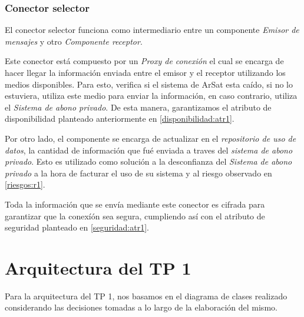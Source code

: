 \documentclass[a4paper, 10pt, twoside]{article}
\begin{document}
\subsubsection{Conector selector}

El conector selector funciona como intermediario entre un componente \textit{Emisor de mensajes} y otro \textit{Componente receptor}.

Este conector está compuesto por un \textit{Proxy de conexión} el cual se encarga de hacer llegar la información enviada entre el emisor y el receptor utilizando los medios disponibles. Para esto, verifica si el sistema de ArSat esta caído, si no lo estuviera, utiliza este medio para enviar la información, en caso contrario, utiliza el \textit{Sistema de abono privado}. De esta manera, garantizamos el atributo de disponibilidad planteado anteriormente en \ref{disponibilidad:atr1}.

Por otro lado, el componente se encarga de actualizar en el \textit{repositorio de uso de datos}, la cantidad de información que fué enviada a traves del \textit{sistema de abono privado}. Esto es utilizado como solución a la desconfianza del \textit{Sistema de abono privado} a la hora de facturar el uso de su sistema y al riesgo observado en \ref{riesgos:r1}.

Toda la información que se envía mediante este conector es cifrada para garantizar que la conexíón sea segura, cumpliendo así con el atributo de seguridad planteado en \ref{seguridad:atr1}.

\newpage




\section{Arquitectura del TP 1}

Para la arquitectura del TP 1, nos basamos en el diagrama de clases realizado considerando las decisiones tomadas a lo largo de la elaboración del mismo.
\end{document}
